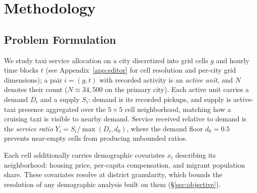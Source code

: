 \section{Methodology}\label{sec:method}

\subsection{Problem Formulation}\label{sec:problem}

We study taxi service allocation on a city discretized into grid cells $g$
and hourly time blocks $t$ (see Appendix~\ref{app:editor} for cell resolution 
and per-city grid dimensions); a pair $i=(g,t)$ with recorded
activity is an \emph{active unit}, and $N$ denotes their count
($N \approx 34{,}500$ on the primary city). Each active unit carries a demand 
$D_i$ and a supply $S_i$: demand is its recorded pickups, and supply is active-taxi presence
aggregated over the $5{\times}5$ cell neighborhood, matching how a cruising
taxi is visible to nearby demand. Service received relative to demand is the \emph{service ratio}
$Y_i = S_i / \max(D_i, d_0)$, where the demand floor $d_0 = 0.5$ prevents
near-empty cells from producing unbounded ratios.

Each cell additionally carries demographic covariates $x_i$ describing its
neighborhood: housing price, per-capita compensation, and migrant population
share. These covariates resolve at district granularity, which bounds the 
resolution of any demographic analysis built on them (\S\ref{sec:objective}).

